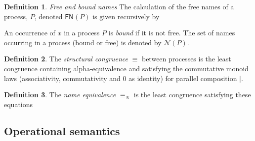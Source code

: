 \documentclass[submission,copyright,creativecommons]{eptcs}
\makeatletter
\newcommand{\pzero}{\mathbin{0}}
\newcommand{\scong}{\mathbin{\equiv}}
\newcommand{\nameeq}{\mathbin{\equiv_N}}
\newcommand{\names}[1]{\mathbin{\mathcal{N}(#1)}}
\newcommand{\freenames}[1]{\mathbin{\mathsf{FN}(#1)}}
\newcommand{\quotep}[1]{\mathsf{@}#1}
\newcommand{\dropn}[1]{\mathsf{*}#1}
\newcommand{\substn}[2]{\{ #1 / #2 \}}
\newcommand{\red}{\rightarrow}
\theoremstyle{definition}
\newtheorem{definition}{Definition}
\theoremstyle{remark}
\theoremstyle{remark}
\makeatother
\begin{document}
\begin{definition}
\emph{Free and bound names} The calculation of the free names of a
process, $P$, denoted $\freenames{P}$ is given recursively by


An occurrence of $x$ in a process $P$ is \textit{bound} if it is not
free. The set of names occurring in a process (bound or free) is
denoted by $\names{P}$.
\end{definition}

\begin{definition}
  The {\em structural congruence} $\equiv$
  between processes \cite{SangiorgiWalker} is the least congruence containing
  alpha-equivalence and satisfying the commutative monoid laws
  (associativity, commutativity and $\pzero$ as identity) for parallel
  composition $|$.
\end{definition}

\begin{definition}
  The {\em name equivalence} $\nameeq$ is the least congruence
  satisfying these equations
\end{definition}

\subsection{Operational semantics} 

\end{document}
